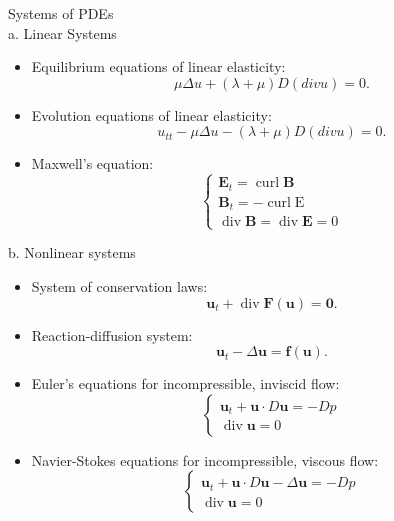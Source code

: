 \begin{example}
    Systems of PDEs
    ~\\ a. Linear Systems
    \begin{itemize}
        \item Equilibrium equations of linear elasticity:
        \[
            \mu\Delta u + (\lambda+ \mu) D(div u) = 0.    
        \]
        \item Evolution equations of linear elasticity:
        \[
            u_{tt} - \mu \Delta u - (\lambda + \mu) D(div u) =0.  
        \] 
        \item Maxwell's equation:
        $$
        \left\{\begin{array}{l}
            \mathbf{E}_{t}=\operatorname{curl} \mathbf{B} \\
            \mathbf{B}_{t}=-\operatorname{curl} \mathrm{E} \\
            \operatorname{div} \mathbf{B}=\operatorname{div} \mathbf{E}=0
            \end{array}\right.
        $$
    \end{itemize}
\noindent b. Nonlinear systems
\begin{itemize}
    \item System of conservation laws:
    \[
        \mathbf{u}_{t}+\operatorname{div} \mathbf{F}(\mathbf{u})=\mathbf{0}.
    \]
    \item Reaction-diffusion system:
    \[
        \mathbf{u}_{t}-\Delta \mathbf{u}=\mathbf{f}(\mathbf{u}).
    \]
    \item Euler's equations for incompressible, inviscid flow:
    \[
        \left\{\begin{array}{l}
            \mathbf{u}_{t}+\mathbf{u} \cdot D \mathbf{u}=-D p \\
            \operatorname{div} \mathbf{u}=0
            \end{array}\right.
    \]
    \item Navier-Stokes equations for incompressible, viscous flow:
    \[
        \left\{\begin{array}{l}
            \mathbf{u}_{t}+\mathbf{u} \cdot D \mathbf{u}-\Delta \mathbf{u}=-D p \\
            \operatorname{div} \mathbf{u}=0
            \end{array}\right.
    \]
\end{itemize}
\end{example}

